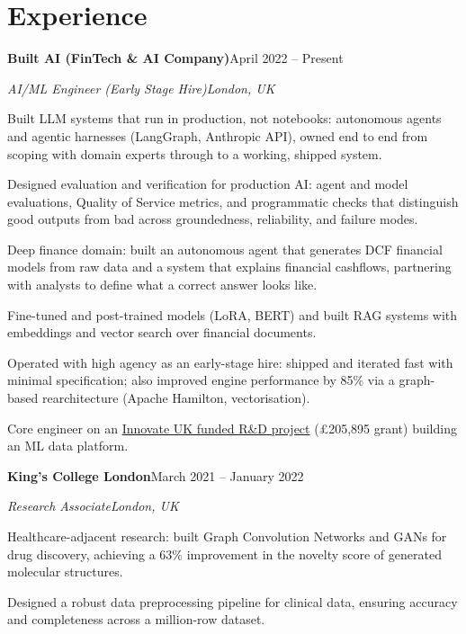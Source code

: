 \documentclass[10pt,a4paper]{article}
\newcommand{\entry}[4]{%
  {\color{company}\bfseries #1}\hfill {\color{muted}#2}\par
  \vspace{1pt}
  {\itshape #3}\hfill {\color{muted}\itshape #4}\par
  \vspace{3pt}%
}
\begin{document}
\section{Experience}
\entry{Built AI (FinTech \& AI Company)}{April 2022 -- Present}{AI/ML Engineer (Early Stage Hire)}{London, UK}
\begin{tight}
  \item Built LLM systems that run in production, not notebooks: autonomous agents and agentic harnesses (LangGraph, Anthropic API), owned end to end from scoping with domain experts through to a working, shipped system.
  \item Designed evaluation and verification for production AI: agent and model evaluations, Quality of Service metrics, and programmatic checks that distinguish good outputs from bad across groundedness, reliability, and failure modes.
  \item Deep finance domain: built an autonomous agent that generates DCF financial models from raw data and a system that explains financial cashflows, partnering with analysts to define what a correct answer looks like.
  \item Fine-tuned and post-trained models (LoRA, BERT) and built RAG systems with embeddings and vector search over financial documents.
  \item Operated with high agency as an early-stage hire: shipped and iterated fast with minimal specification; also improved engine performance by 85\% via a graph-based rearchitecture (Apache Hamilton, vectorisation).
  \item Core engineer on an \href{https://gtr.ukri.org/projects?ref=10022996}{Innovate UK funded R\&D project} (\pounds205,895 grant) building an ML data platform.
\end{tight}

\entry{King's College London}{March 2021 -- January 2022}{Research Associate}{London, UK}
\begin{tight}
  \item Healthcare-adjacent research: built Graph Convolution Networks and GANs for drug discovery, achieving a 63\% improvement in the novelty score of generated molecular structures.
  \item Designed a robust data preprocessing pipeline for clinical data, ensuring accuracy and completeness across a million-row dataset.
\end{tight}

\end{document}
